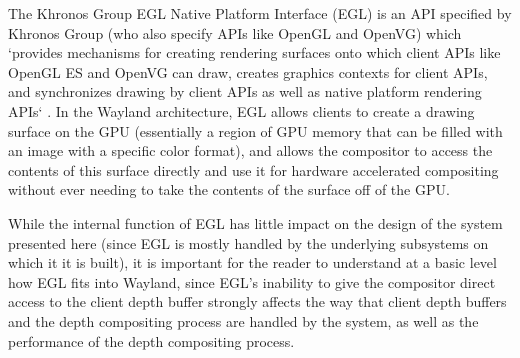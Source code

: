 The Khronos Group EGL Native Platform Interface (EGL) \cite{egl} is an API specified by Khronos Group (who also specify APIs like OpenGL and OpenVG) which `provides mechanisms for creating rendering surfaces onto which client APIs like OpenGL ES and OpenVG can draw, creates graphics contexts for client APIs, and synchronizes drawing by client APIs as well as native platform rendering APIs` \cite{egl}. In the Wayland architecture, EGL allows clients to create a drawing surface on the GPU (essentially a region of GPU memory that can be filled with an image with a specific color format), and allows the compositor to access the contents of this surface directly  and use it for hardware accelerated compositing without ever needing to take the contents of the surface off of the GPU. 

While the internal function of EGL has little impact on the design of the system presented here (since EGL is mostly handled by the underlying subsystems on which it it is built), it is important for the reader to understand at a basic level how EGL fits into Wayland, since EGL's inability to give the compositor direct access to the client depth buffer strongly affects the way that client depth buffers and the depth compositing process are handled by the system, as well as the performance of the depth compositing process.